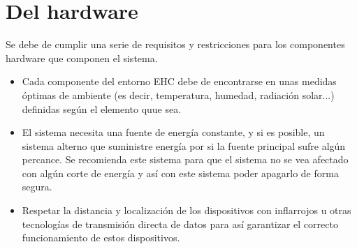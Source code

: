 \section{Del hardware}
Se debe de cumplir una serie de requisitos y restricciones para los componentes hardware que componen el sistema.
\begin{itemize}
\item Cada componente del entorno EHC debe de encontrarse en unas medidas \'optimas de ambiente (es decir, temperatura, humedad, radiaci\'on solar...) definidas seg\'un el elemento quue sea.
\item El sistema necesita una fuente de energ\'ia constante, y si es posible, un sistema alterno que suministre energ\'ia por si la fuente principal sufre alg\'un percance. Se recomienda este sistema para que el sistema no se vea afectado con alg\'un corte de energ\'ia y as\'i con este sistema poder apagarlo de forma segura.
\item Respetar la distancia y localizaci\'on de los dispositivos con inflarrojos u otras tecnolog\'ias de transmisi\'on directa de datos para as\'i garantizar el correcto funcionamiento de estos dispositivos. 
\end{itemize}